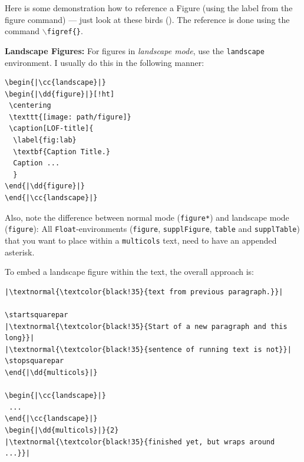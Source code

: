 \begin{multicols}{2}
Here is some demonstration how to reference a Figure (using the label from the figure command) --- just look at these birds ().
The reference is done using the command \texttt{$\backslash$figref\{\}}.

\textbf{Landscape Figures:} For figures in \textit{landscape mode}, use the \texttt{landscape} environment.
I usually do this in the following manner:

\begin{tcolorbox}[arc=0pt,outer arc=0pt,breakable,colback=black!05,colframe=black!10,pad at break=2mm,boxrule=0.1pt]
\begin{lstlisting}
\begin{|\cc{landscape}|}
\begin{|\dd{figure}|}[!ht]
 \centering
 \texttt{[image: path/figure]}
 \caption[LOF-title]{
  \label{fig:lab}
  \textbf{Caption Title.}
  Caption ...
  }
\end{|\dd{figure}|}
\end{|\cc{landscape}|}
\end{lstlisting}
\end{tcolorbox}

Also, note the difference between normal mode (\texttt{figure*}) and landscape mode (\texttt{figure}):
All \texttt{Float}-environments (\texttt{figure}, \texttt{supplFigure}, \texttt{table} and \texttt{supplTable}) that you want to place within a \texttt{multicols} text, need to have an  appended asterisk.

To embed a landscape figure within the text, the overall approach is:

\begin{tcolorbox}[arc=0pt,outer arc=0pt,breakable,colback=black!05,colframe=black!10,pad at break=2mm,boxrule=0.1pt]
\begin{lstlisting}
|\textnormal{\textcolor{black!35}{text from previous paragraph.}}|

\startsquarepar
|\textnormal{\textcolor{black!35}{Start of a new paragraph and this long}}|
|\textnormal{\textcolor{black!35}{sentence of running text is not}}|
\stopsquarepar
\end{|\dd{multicols}|}

\begin{|\cc{landscape}|}
 ...
\end{|\cc{landscape}|}
\begin{|\dd{multicols}|}{2}
|\textnormal{\textcolor{black!35}{finished yet, but wraps around ...}}|
\end{lstlisting}
\end{tcolorbox}


\end{multicols}
